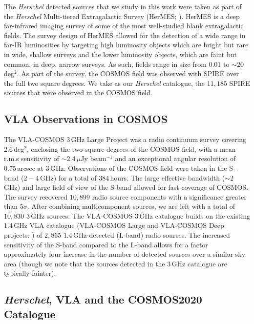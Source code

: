 The \textit{Herschel} detected sources that we study in this work were taken as part of the \textit{Herschel} Multi-tiered Extragalactic Survey (HerMES; \citealt{Oliver_2012}). HerMES is a deep far-infrared imaging survey of some of the most well-studied blank extragalactic fields. The survey design of HerMES allowed for the detection of a wide range in far-IR luminosities by targeting high luminosity objects which are bright but rare in wide, shallow surveys and the lower luminosity objects, which are faint but common, in deep, narrow surveys. As such, fields range in size from $0.01$ to $\sim 20\,$deg$^2$. As part of the survey, the COSMOS field was observed with SPIRE over the full two square degrees. We take as our \textit{Herschel} catalogue, the $11,185$ SPIRE sources that were observed in the COSMOS field.

\subsection{VLA Observations in COSMOS}
\label{sec:VLA_observations}

The VLA-COSMOS $3\,$GHz Large Project was a radio continuum survey covering $2.6\,$deg$^{2}$, enclosing the two square degrees of the COSMOS field, with a mean r.m.s sensitivity of $\sim 2.4\,\mu$Jy beam$^{-1}$ and an exceptional angular resolution of $0.75\,$arcsec at $3\,$GHz. Observations of the COSMOS field were taken in the S-band ($2 - 4\,$GHz) for a total of $384\,$hours. The large effective bandwidth ($\sim 2\,$GHz) and large field of view of the S-band allowed for fast coverage of COSMOS. The survey recovered $10,899$ radio source components with a significance greater than $5\sigma$. After combining multicomponent sources, we are left with a total of $10,830$ $3\,$GHz sources. The VLA-COSMOS $3\,$GHz catalogue builds on the existing $1.4\,$GHz VLA catalogue (VLA-COSMOS Large and VLA-COSMOS Deep projects: \citealt{Schinnerer_2004, Schinnerer_2007, Schinnerer_2010}) of $2,865$ $1.4\,$GHz-detected (L-band) radio sources. The increased sensitivity of the S-band compared to the L-band allows for a factor approximately four increase in the number of detected sources over a similar sky area (though we note that the sources detected in the $3\,$GHz catalogue are typically fainter).

\subsection{\textit{Herschel}, VLA and the COSMOS2020 Catalogue}

